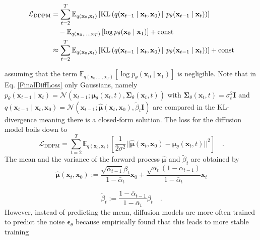 \begin{align}
    \mathcal{L}_{\text{DDPM}}  &= \sum_{t=2}^T  \mathbb{E}_{q(\mathbf{x}_0,\mathbf{x}_t)} \left[ \text{KL} \left( q(\mathbf{x}_{t-1} \mid \mathbf{x}_t, \mathbf{x}_0) \,\|\,  p_\theta(\mathbf{x}_{t-1} \mid \mathbf{x}_t) \right) \right] \notag \\
    &\quad -  \mathbb{E}_{q(\mathbf{x}_0,\dots,\mathbf{x}_T)} \left[\log p_\theta(\mathbf{x}_0 \mid \mathbf{x}_1) \right] + \text{const} \\
    & \approx \sum_{t=2}^T  \mathbb{E}_{q(\mathbf{x}_0,\mathbf{x}_t)} \left[ \text{KL} \left( q(\mathbf{x}_{t-1} \mid \mathbf{x}_t, \mathbf{x}_0) \,\|\,  p_\theta(\mathbf{x}_{t-1} \mid \mathbf{x}_t) \right) \right] + \text{const}
    \label{FinalDiffLoss}
\end{align}


assuming that the term $\mathbb{E}_{q(\mathbf{x}_0,\dots,\mathbf{x}_T)} \left[\log p_\theta(\mathbf{x}_0 \mid \mathbf{x}_1) \right]$ is negligible. Note that in Eq. \ref{FinalDiffLoss} only Gaussians, namely $p_\theta(\mathbf{x}_{t-1} \mid \mathbf{x}_t) = \mathcal{N}\left( \mathbf{x}_{t-1}; \boldsymbol{\mu}_\theta(\mathbf{x}_t,t),\mathbf{\Sigma}_\theta(\mathbf{x}_t,t) \right)$  with $\mathbf{\Sigma}_\theta(\mathbf{x}_t,t) = \sigma_t^2 \mathbf{I}$ and $q(\mathbf{x}_{t-1} \mid \mathbf{x}_t, \mathbf{x}_0) = \mathcal{N} \left( \mathbf{x}_{t-1}; \boldsymbol{\hat{\mu}}(\mathbf{x}_t,\mathbf{x}_0), \tilde{\beta}_t \mathbf{I}  \right)$ are compared in the \gls{KL}-divergence meaning there is a closed-form solution. The loss for the diffusion model boils down to 
\begin{equation}
    \mathcal{L}_{\text{DDPM}} = \sum_{t=2}^T \mathbb{E}_{q(\mathbf{x}_0,\mathbf{x}_t)} \left[ \frac{1}{2\sigma^2} || \boldsymbol{\hat{\mu}}(\mathbf{x}_t, \mathbf{x}_0) - \boldsymbol{\mu}_\theta(\mathbf{x}_t,t) ||^2  \right] \quad.
    \label{MeanLossDiffModel}
\end{equation}
The mean and the variance of the forward process $\boldsymbol{\hat{\mu}}$ and $\tilde{\beta}_t$ are obtained by 
\begin{equation}
    \boldsymbol{\hat{\mu}}(\mathbf{x}_t, \mathbf{x}_0) := \frac{\sqrt{\bar{\alpha}_{t-1}} \beta_t}{1 - \bar{\alpha}_t} \mathbf{x}_0 + \frac{\sqrt{\alpha_t}(1 - \bar{\alpha}_{t-1})}{1 - \bar{\alpha}_t} \mathbf{x}_t
\end{equation}

\begin{equation}
    \tilde{\beta}_t := \frac{1 - \bar{\alpha}_{t-1}}{1 - \bar{\alpha}_t} \beta_t \quad.
\end{equation}
However, instead of predicting the mean, diffusion models are more often trained to predict the noise $\boldsymbol{\epsilon}_\theta$  because \cite{DDPM} empirically found that this leads to more stable training 

